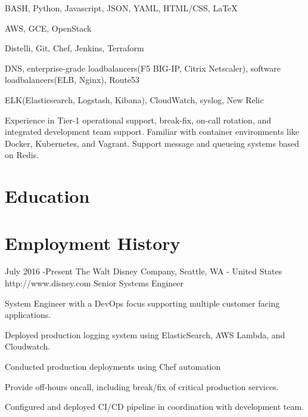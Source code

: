 \documentclass[10pt]{article} %
\begin{document}
{
BASH, Python, Javascript, JSON, YAML, HTML/CSS, LaTeX
}

{
AWS, GCE, OpenStack
}

{
Distelli, Git, Chef, Jenkins, Terraform
}

{
DNS, enterprise-grade loadbalancers(F5 BIG-IP, Citrix Netscaler), software loadbalancers(ELB, Nginx), Route53
}

{
ELK(Elasticsearch, Logstash, Kibana), CloudWatch, syslog, New Relic
}

{
Experience in Tier-1 operational support, break-fix, on-call rotation, and integrated development team support. Familiar with container environments like Docker, Kubernetes, and Vagrant. Support message and queueing systems based on Redis.
}

\section{Education}



\section{Employment History}

\job
{July 2016 -}{Present}
{The Walt Disney Company, Seattle, WA - United States}
{http://www.disney.com}
{Senior Systems Engineer}
{
\begin{itemize-noindent}
\item{System Engineer with a DevOps focus supporting multiple customer facing applications.}
\item{Deployed production logging system using ElasticSearch, AWS Lambda, and Cloudwatch.}
\item{Conducted production deployments using Chef automation}
\item{Provide off-hours oncall, including break/fix of critical production services.}
\item{Configured and deployed CI/CD pipeline in coordination with development team.}
\end{itemize-noindent}
}
\end{document}
